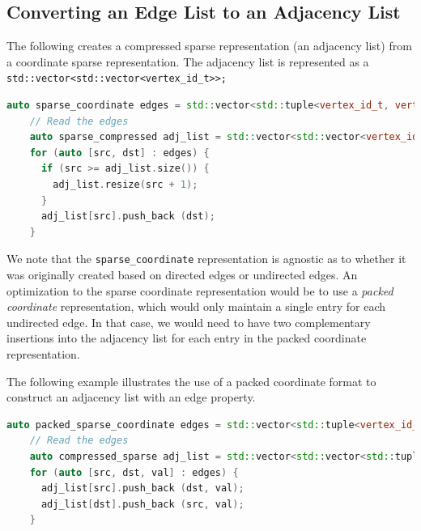 \subsection{Converting an Edge List to an Adjacency List}

The following creates a compressed sparse representation (an adjacency list) from a coordinate sparse representation.  The adjacency list is represented as 
a \lstinline{std::vector<std::vector<vertex_id_t>>;}
\begin{lstlisting}[language=C++]
    auto sparse_coordinate edges = std::vector<std::tuple<vertex_id_t, vertex_id_t>;
    // Read the edges
    auto sparse_compressed adj_list = std::vector<std::vector<vertex_id_t>>;
    for (auto [src, dst] : edges) {
      if (src >= adj_list.size()) {
        adj_list.resize(src + 1);
      }
      adj_list[src].push_back (dst);
    }
\end{lstlisting}

We note that the \lstinline{sparse_coordinate} representation is agnostic as to whether it was originally created based on directed edges or undirected edges.  An optimization to the sparse coordinate representation would be to use a \emph{packed coordinate} representation, which would only maintain a single entry for each undirected edge.  In that case, we would need to have two complementary insertions into the adjacency list for each entry in the packed coordinate representation.

The following example illustrates the use of a packed coordinate format to construct an adjacency list with an edge property.
\begin{lstlisting}[language=C++]
    auto packed_sparse_coordinate edges = std::vector<std::tuple<vertex_id_t, vertex_id_t, double>>;
    // Read the edges
    auto compressed_sparse adj_list = std::vector<std::vector<std::tuple<vertex_id_t, double>>>(edges.num_vertices();
    for (auto [src, dst, val] : edges) {
      adj_list[src].push_back (dst, val);
      adj_list[dst].push_back (src, val);
    }
 \end{lstlisting}




